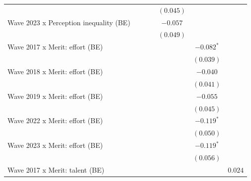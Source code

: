 \documentclass[
  12pt,
]{article}
\begin{document}
\begin{table}
{\begin{center}
{\begin{tabular}{l c c c c c c}
                                                   &               &               &                & $(0.045)$    &               &               \\
Wave 2023 x Perception inequality (BE)             &               &               &                & $-0.057$     &               &               \\
                                                   &               &               &                & $(0.049)$    &               &               \\
Wave 2017 x Merit: effort (BE)                     &               &               &                &              & $-0.082^{*}$  &               \\
                                                   &               &               &                &              & $(0.039)$     &               \\
Wave 2018 x Merit: effort (BE)                     &               &               &                &              & $-0.040$      &               \\
                                                   &               &               &                &              & $(0.041)$     &               \\
Wave 2019 x Merit: effort (BE)                     &               &               &                &              & $-0.055$      &               \\
                                                   &               &               &                &              & $(0.045)$     &               \\
Wave 2022 x Merit: effort (BE)                     &               &               &                &              & $-0.119^{*}$  &               \\
                                                   &               &               &                &              & $(0.050)$     &               \\
Wave 2023 x Merit: effort (BE)                     &               &               &                &              & $-0.119^{*}$  &               \\
                                                   &               &               &                &              & $(0.056)$     &               \\
Wave 2017 x Merit: talent (BE)                     &               &               &                &              &               & $0.024$       \\

\end{tabular}}
\end{center}}
\end{table}
\end{document}
